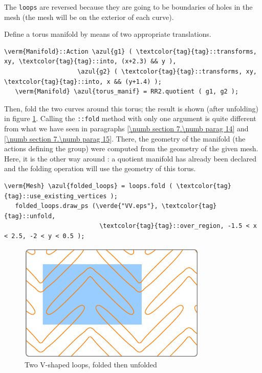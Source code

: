 The {\small\tt loops} are reversed because they are going to be boundaries of holes
in the mesh (the mesh will be on the exterior of each curve).

Define a torus manifold by means of two appropriate translations.

\begin{Verbatim}[commandchars=\\\{\},formatcom=\small\tt,frame=single,
   rulecolor=\color{coment},baselinestretch=0.94,framesep=2mm         ]
   \verm{Manifold}::Action \azul{g1} ( \textcolor{tag}{tag}::transforms, xy, \textcolor{tag}{tag}::into, (x+2.3) && y ),
                    \azul{g2} ( \textcolor{tag}{tag}::transforms, xy, \textcolor{tag}{tag}::into, x && (y+1.4) );
   \verm{Manifold} \azul{torus_manif} = RR2.quotient ( g1, g2 );
\end{Verbatim}

\vskip -2mm
Then, fold the two curves around this torus; the result is shown (after unfolding) in figure
\ref{\numb section 7.\numb fig 13}.
Calling the {\small\tt{}::fold} method with only one argument is quite different
from what we have seen in paragraphs \ref{\numb section 7.\numb parag 14} and
\ref{\numb section 7.\numb parag 15}.
There, the geometry of the manifold (the actions defining the group) were computed from
the geometry of the given mesh.
Here, it is the other way around : a quotient manifold has already been declared and
the folding operation will use the geometry of this torus.

\begin{Verbatim}[commandchars=\\\{\},formatcom=\small\tt,frame=single,
   rulecolor=\color{coment},baselinestretch=0.94,framesep=2mm         ]
   \verm{Mesh} \azul{folded_loops} = loops.fold ( \textcolor{tag}{tag}::use_existing_vertices );
   folded_loops.draw_ps (\verde{"VV.eps"}, \textcolor{tag}{tag}::unfold,
                          \textcolor{tag}{tag}::over_region, -1.5 < x < 2.5, -2 < y < 0.5 );
\end{Verbatim}

\begin{figure}[ht] \centering
  \includegraphics[width=90mm]{boomerang-2.eps}
  \caption{Two V-shaped loops, folded then unfolded}
  \label{\numb section 7.\numb fig 13}
\end{figure}

